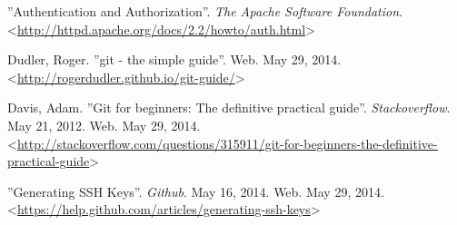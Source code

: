  ''Authentication and Authorization''. \textit{The
Apache Software Foundation}.
<\url{http://httpd.apache.org/docs/2.2/howto/auth.html}>

 Dudler, Roger. ''git - the simple guide''. Web. May 29, 2014. 
<\url{http://rogerdudler.github.io/git-guide/}>

 Davis, Adam. ''Git for beginners: The definitive
practical guide''. \textit{Stackoverflow}. May 21, 2012. Web. May 29, 2014.
<\url{http://stackoverflow.com/questions/315911/git-for-beginners-the-definitive-practical-guide}>

 ''Generating SSH Keys''. \textit{Github}.  May 16, 2014. Web. May 29,
2014. <\url{https://help.github.com/articles/generating-ssh-keys}>
